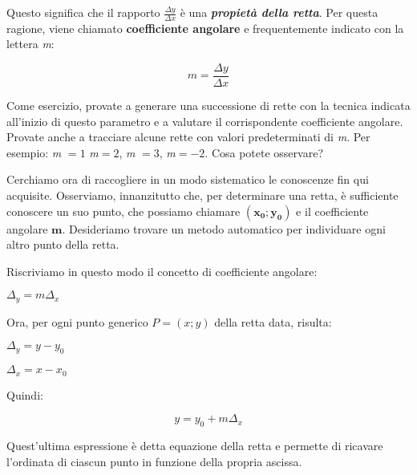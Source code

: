 Questo significa che il rapporto $\frac{\Delta y}{\Delta x}$ è una {\bfseries \slshape {propietà della retta}}.
Per questa ragione, viene chiamato {\bfseries coefficiente angolare} e frequentemente indicato con la lettera {\slshape m}:
\begin{center}
\begin{equation}
m = \frac{\Delta y}{\Delta x}
\end{equation}
\end{center}

Come esercizio, provate a generare una successione di rette con la tecnica indicata all'inizio di questo parametro e a valutare il corrispondente coefficiente angolare.\newline
Provate anche a tracciare alcune rette con valori predeterminati di {\slshape m}. Per esempio: {\slshape m} $= 1$ {\slshape m}$ = 2$, {\slshape m} $= 3$, {\slshape m}$ = -2$.\newline
Cosa potete osservare?
\newline

Cerchiamo ora di raccogliere in un modo sistematico le conoscenze fin qui acquisite.
\newline
Osserviamo, innanzitutto che, per determinare una retta, è sufficiente conoscere un suo punto, che possiamo chiamare $\mathbf {(x_0;y_0)}$ e il coefficiente angolare $\mathbf m$.
\newline
Desideriamo trovare un metodo automatico per individuare ogni altro punto della retta.
\newline

Riscriviamo in questo modo il concetto di coefficiente angolare:
\newline
\begin{center}
\begin{math}
\Delta_y = m \Delta_x
\end{math}
\end{center}
Ora, per ogni punto generico $P = (x;y)$ della retta data, risulta:
\begin{center}
\begin{math}
\Delta_y = y - y_0
\end{math}
\end{center}

\begin{center}
\begin{math}
\Delta_x = x - x_0
\end{math}
\end{center}
Quindi:
\begin{center}
\begin{equation}\label{eq:equazioneDellaRetta}
y = y_0 + m \Delta_x
\end{equation}
\end{center}
Quest'ultima espressione è detta equazione della retta e permette di ricavare l'ordinata di ciascun punto in funzione della propria ascissa.
